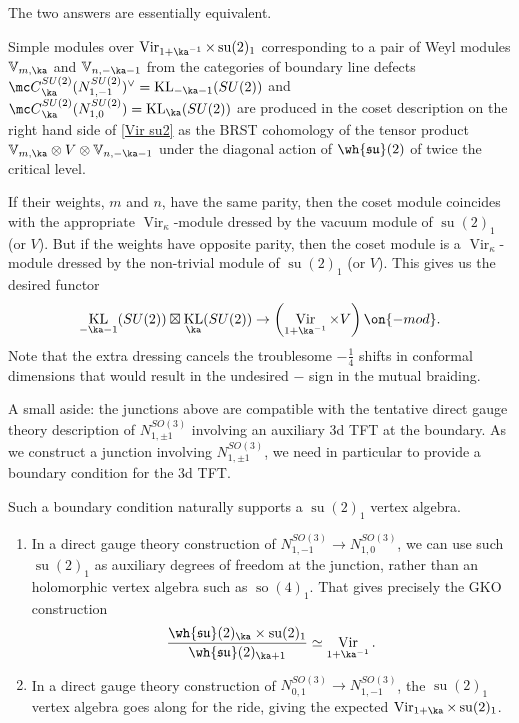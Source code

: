 \documentclass[11pt,reqno]{amsart}
\theoremstyle{plain}
\numberwithin{equation}{section}
\DeclareMathOperator{\Vir}{Vir}
\DeclareMathOperator{\tsu}{su}
\DeclareMathOperator{\tso}{so}
\DeclareMathOperator{\KL}{KL}
\theoremstyle{definition}
\begin{document}
\medskip

The two answers are essentially equivalent. 

Simple modules over $\Vir_{1+\ka^{-1}} \times \tsu(2)_1$  corresponding to a pair of
Weyl modules ${\mathbb V}_{m,\ka}$ and ${\mathbb V}_{n,-\ka-1}$ from
the categories of boundary line defects ${\mc
  C}^{SU(2)}_\ka(N^{SU(2)}_{1,-1})^\vee = \KL_{-\ka-1}(SU(2))$ and
${\mc C}^{SU(2)}_\ka(N^{SU(2)}_{1,0}) = \KL_\ka(SU(2))$ are produced
in the coset description on the right hand side of \eqref{Vir su2}
 as the BRST cohomology of the tensor product ${\mathbb
  V}_{m,\ka} \otimes V \otimes {\mathbb V}_{n,-\ka-1}$ under the
diagonal action of $\wh{\mathfrak{su}}(2)$ of twice the critical
level.

If their weights, $m$ and $n$, have the same parity, then the
coset module coincides with the appropriate $\Vir_\kappa$-module
dressed by the vacuum module of $\tsu(2)_1$ (or $V$). But if the
weights have opposite parity, then the coset module is a
$\Vir_\kappa$-module dressed by the non-trivial module of $\tsu(2)_1$
(or $V$). This gives us the desired functor
$$
\KL_{-\ka-1}(SU(2)) \boxtimes \KL_\ka(SU(2))
 \to \left(\Vir_{1+\ka^{-1}} \times V
\right)\on{-mod}.
$$
Note that the extra dressing cancels the troublesome $-\frac14$ shifts
in conformal dimensions that would result in the undesired $-$ sign
in the mutual braiding.

A small aside: the junctions above are compatible with the 
tentative direct gauge theory description of $N^{SO(3)}_{1,\pm 1}$
involving an auxiliary 3d TFT at the boundary. As we construct a junction 
involving $N^{SO(3)}_{1,\pm 1}$, we need in particular to provide a boundary condition 
for the 3d TFT. 

Such a boundary condition naturally supports a $\tsu(2)_1$ vertex algebra. 

\medskip

\begin{enumerate}
\item In a direct gauge theory construction of $N^{SO(3)}_{1,-1} \to
N^{SO(3)}_{1,0}$, we can use such $\tsu(2)_1$ as auxiliary degrees of freedom at the junction, 
rather than an holomorphic vertex algebra such as $\tso(4)_1$. That gives precisely the GKO construction 
\begin{equation} 
\frac{\wh{\mathfrak{su}}(2)_{\ka} \times
  \tsu(2)_1}{\wh{\mathfrak{su}}(2)_{\ka+1}}\simeq \Vir_{1+\ka^{-1}}.
\end{equation}

\medskip

\item In a direct gauge theory construction of $N^{SO(3)}_{0,1} \to N^{SO(3)}_{1,-1}$,
the $\tsu(2)_1$ vertex algebra goes along for the ride, giving the expected $\Vir_{1+\ka} \times \tsu(2)_1$.
\end{enumerate} 
\end{document}
